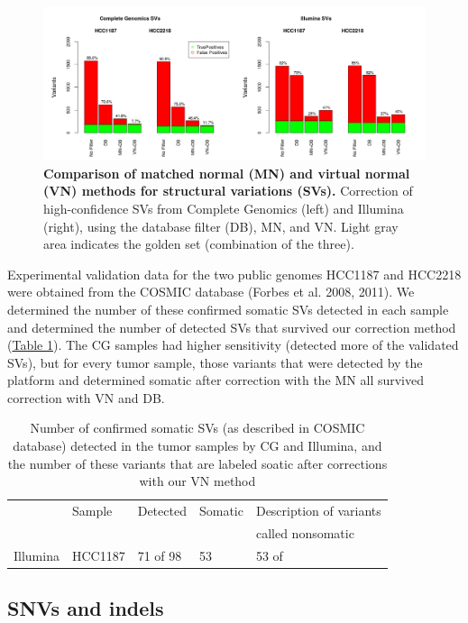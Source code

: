 \begin{figure}[t!]
\centering
\includegraphics[width=\textwidth]{chapters/images/virtualnormal/Hiltemann_Figure1.png}
\caption{\textbf{Comparison of matched normal (MN) and virtual normal (VN) methods for structural variations (SVs).} Correction of high-confidence SVs from Complete Genomics (left) and Illumina (right), using the database filter (DB), MN, and VN. Light gray area indicates the golden set (combination of the three).}
\label{fig:svcomparison}
\end{figure}

Experimental validation data for the two public genomes HCC1187 and HCC2218 were obtained from the COSMIC database (Forbes et al. 2008, 2011). We determined the number of these confirmed somatic SVs detected in each sample and determined the number of detected SVs that survived our correction method (\hyperref[table:table]{Table \ref{table:table1}}). The CG samples had higher sensitivity (detected more of the validated SVs), but for every tumor sample, those variants that were detected by the platform and determined somatic after correction with the MN all survived correction with VN and DB.

\small
\begin{table}[t!]
\begin{tabular}{lllll}
          & Sample & Detected & Somatic & Description of variants \\
          &        &          &         & called nonsomatic       \\\hline
Illumina  & HCC1187 & 71 of 98 & 53 & 53 of
\end{tabular}
\caption{Number of confirmed somatic SVs (as described in COSMIC database) detected in the tumor samples by CG and Illumina, and the number of these variants that are labeled soatic after corrections with our VN method}
\label{table:table1}
\end{table}
\normalsize

\subsection*{SNVs and indels}




\cite{ireport}




